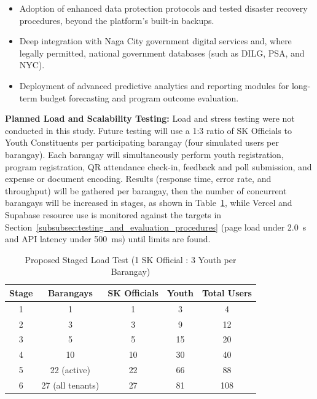 \begin{itemize}
    \item Adoption of enhanced data protection protocols and tested disaster recovery procedures, beyond the platform's built-in backups.
    \item Deep integration with Naga City government digital services and, where legally permitted, national government databases (such as DILG, PSA, and NYC).
    \item Deployment of advanced predictive analytics and reporting modules for long-term budget forecasting and program outcome evaluation.
\end{itemize}

\vspace{2mm}
\textbf{Planned Load and Scalability Testing:} Load and stress testing were not conducted in this study. Future testing will use a 1:3 ratio of SK Officials to Youth Constituents per participating barangay (four simulated users per barangay). Each barangay will simultaneously perform youth registration, program registration, QR attendance check-in, feedback and poll submission, and expense or document encoding. Results (response time, error rate, and throughput) will be gathered per barangay, then the number of concurrent barangays will be increased in stages, as shown in Table~\ref{tab:proposed_load_test_stages}, while Vercel and Supabase resource use is monitored against the targets in Section~\ref{subsubsec:testing_and_evaluation_procedures} (page load under 2.0~s and API latency under 500~ms) until limits are found.

\begin{table}[H]
\centering
\small
\caption{Proposed Staged Load Test (1 SK Official : 3 Youth per Barangay)}
\label{tab:proposed_load_test_stages}
\begin{tabular}{|c|c|c|c|c|}
\hline
\textbf{Stage} & \textbf{Barangays} & \textbf{SK Officials} & \textbf{Youth} & \textbf{Total Users} \\ \hline
1 & 1 & 1 & 3 & 4 \\ \hline
2 & 3 & 3 & 9 & 12 \\ \hline
3 & 5 & 5 & 15 & 20 \\ \hline
4 & 10 & 10 & 30 & 40 \\ \hline
5 & 22 (active) & 22 & 66 & 88 \\ \hline
6 & 27 (all tenants) & 27 & 81 & 108 \\ \hline
\end{tabular}
\end{table}
\vspace{5mm}
